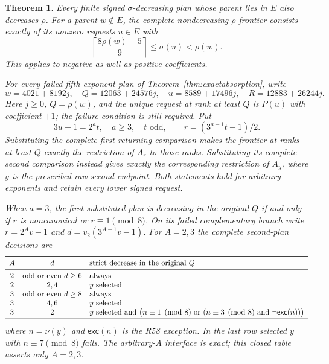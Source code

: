 \documentclass[11pt]{article}
\newtheorem{theorem}{Theorem}
\begin{document}
\begin{theorem}\label{thm:defectresolution}
Every finite signed $\sigma$-decreasing plan whose parent lies in $E$
also decreases $\rho$. For a parent $w\notin E$, the complete
nondecreasing-$\rho$ frontier consists exactly of its nonzero requests
$u\in E$ with
\[
 \left\lceil\frac{8\rho(w)-5}{9}\right\rceil
 \le\sigma(u)<\rho(w).
\]
This applies to negative as well as positive coefficients.

For every failed fifth-exponent plan of
Theorem~\ref{thm:exactabsorption}, write
\[
 w=4021+8192j,\quad Q=12063+24576j,\quad
 u=8589+17496j,\quad R=12883+26244j.
\]
Here $j\ge0$, $Q=\rho(w)$, and the unique request at rank at least
$Q$ is $P(u)$ with coefficient $+1$; the failure condition is still
required. Put
\[
 3u+1=2^at,\quad a\ge3,\quad t\text{ odd},\qquad
 r=(3^{a-1}t-1)/2.
\]
Substituting the complete first returning comparison makes the frontier
at ranks at least $Q$ exactly the restriction of $A_r$ to those ranks.
Substituting its complete second comparison instead gives exactly the
corresponding restriction of $A_y$, where $y$ is the prescribed raw
second endpoint. Both statements hold for arbitrary exponents and retain
every lower signed request.

When $a=3$, the first substituted plan is decreasing in the original
$Q$ if and only if $r$ is noncanonical or $r\equiv1\pmod8$.
On its failed complementary branch write
$r=2^Av-1$ and $d=v_2(3^{A-1}v-1)$. For $A=2,3$ the complete
second-plan decisions are
\[
\begin{array}{ccl}
\toprule
A&d&\text{strict decrease in the original }Q\\
\midrule
2&\text{odd or even }d\ge6&\text{always}\\
2&2,4&y\text{ selected}\\
3&\text{odd or even }d\ge8&\text{always}\\
3&4,6&y\text{ selected}\\
3&2&y\text{ selected and }
 \bigl(n\equiv1\pmod8\text{ or }(n\equiv3\pmod8
 \text{ and }\neg\mathsf{exc}(n))\bigr)\\
\bottomrule
\end{array}
\]
where $n=\nu(y)$ and $\mathsf{exc}(n)$ is the R58 exception.
In the last row selected $y$ with $n\equiv7\pmod8$
fails. The arbitrary-$A$ interface is exact; this closed table asserts
only $A=2,3$.
\end{theorem}
\end{document}

